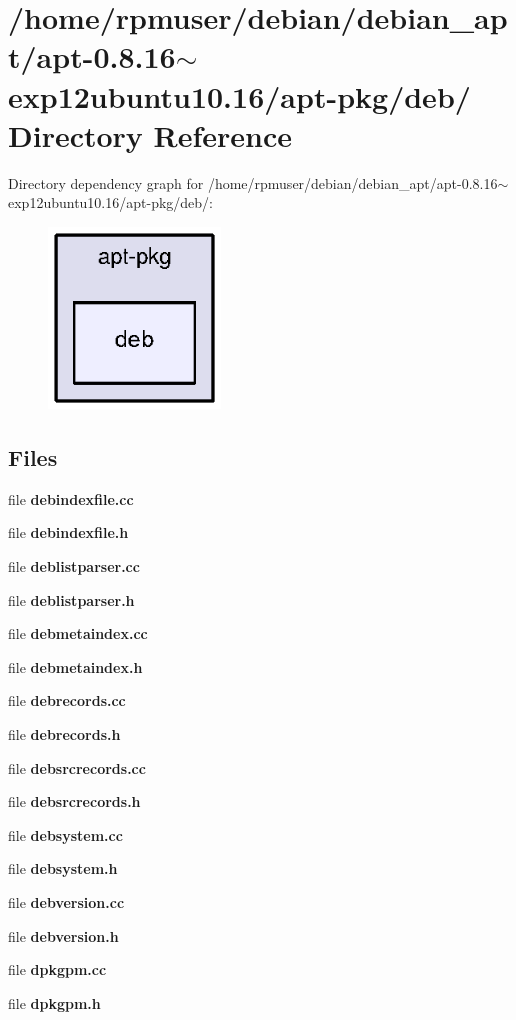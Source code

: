 \section{/home/rpmuser/debian/debian\-\_\-apt/apt-\/0.8.16$\sim$exp12ubuntu10.16/apt-\/pkg/deb/ \-Directory \-Reference}
\label{dir_67fcfac41215b2a5379f0cbe00f62a54}
\-Directory dependency graph for /home/rpmuser/debian/debian\-\_\-apt/apt-\/0.8.16$\sim$exp12ubuntu10.16/apt-\/pkg/deb/\-:
\nopagebreak
\begin{figure}[H]
\begin{center}
\leavevmode
\includegraphics[width=130pt]{dir_67fcfac41215b2a5379f0cbe00f62a54_dep}
\end{center}
\end{figure}
\subsection*{\-Files}
\begin{DoxyCompactItemize}
\item 
file {\bfseries debindexfile.\-cc}
\item 
file {\bfseries debindexfile.\-h}
\item 
file {\bfseries deblistparser.\-cc}
\item 
file {\bfseries deblistparser.\-h}
\item 
file {\bfseries debmetaindex.\-cc}
\item 
file {\bfseries debmetaindex.\-h}
\item 
file {\bfseries debrecords.\-cc}
\item 
file {\bfseries debrecords.\-h}
\item 
file {\bfseries debsrcrecords.\-cc}
\item 
file {\bfseries debsrcrecords.\-h}
\item 
file {\bfseries debsystem.\-cc}
\item 
file {\bfseries debsystem.\-h}
\item 
file {\bfseries debversion.\-cc}
\item 
file {\bfseries debversion.\-h}
\item 
file {\bfseries dpkgpm.\-cc}
\item 
file {\bfseries dpkgpm.\-h}
\end{DoxyCompactItemize}
